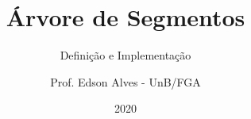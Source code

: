 \title{Árvore de Segmentos}
\subtitle{Definição e Implementação}
\author{Prof. Edson Alves - UnB/FGA}
\date{2020}
